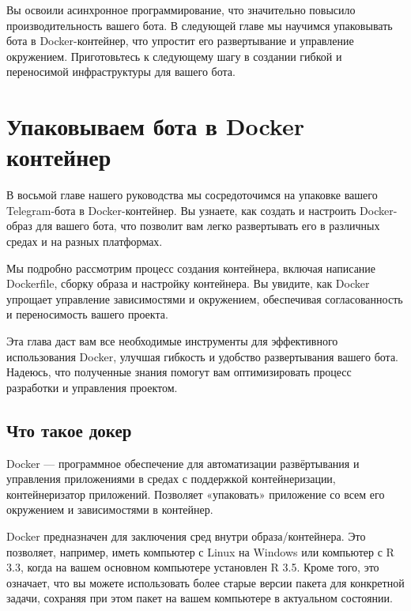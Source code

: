 \documentclass[
]{book}
\begin{document}
Вы освоили асинхронное программирование, что значительно повысило производительность вашего бота. В следующей главе мы научимся упаковывать бота в Docker-контейнер, что упростит его развертывание и управление окружением. Приготовьтесь к следующему шагу в создании гибкой и переносимой инфраструктуры для вашего бота.

\chapter{Упаковываем бота в Docker контейнер}\label{ux443ux43fux430ux43aux43eux432ux44bux432ux430ux435ux43c-ux431ux43eux442ux430-ux432-docker-ux43aux43eux43dux442ux435ux439ux43dux435ux440}

В восьмой главе нашего руководства мы сосредоточимся на упаковке вашего Telegram-бота в Docker-контейнер. Вы узнаете, как создать и настроить Docker-образ для вашего бота, что позволит вам легко развертывать его в различных средах и на разных платформах.

Мы подробно рассмотрим процесс создания контейнера, включая написание Dockerfile, сборку образа и настройку контейнера. Вы увидите, как Docker упрощает управление зависимостями и окружением, обеспечивая согласованность и переносимость вашего проекта.

Эта глава даст вам все необходимые инструменты для эффективного использования Docker, улучшая гибкость и удобство развертывания вашего бота. Надеюсь, что полученные знания помогут вам оптимизировать процесс разработки и управления проектом.

\section{Что такое докер}\label{ux447ux442ux43e-ux442ux430ux43aux43eux435-ux434ux43eux43aux435ux440}

Docker --- программное обеспечение для автоматизации развёртывания и управления приложениями в средах с поддержкой контейнеризации, контейнеризатор приложений. Позволяет «упаковать» приложение со всем его окружением и зависимостями в контейнер.

Docker предназначен для заключения сред внутри образа/контейнера. Это позволяет, например, иметь компьютер с Linux на Windows или компьютер с R 3.3, когда на вашем основном компьютере установлен R 3.5. Кроме того, это означает, что вы можете использовать более старые версии пакета для конкретной задачи, сохраняя при этом пакет на вашем компьютере в актуальном состоянии.
\end{document}
